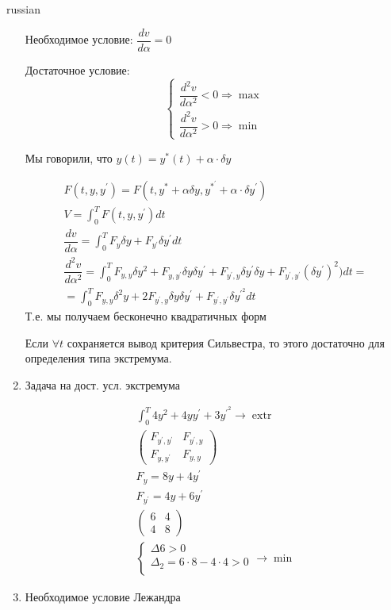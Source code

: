 \documentclass{article}
\begin{document}
\begin{otherlanguage*}{russian}
\begin{enumerate}
Необходимое условие: $ \dfrac{dv}{d \alpha} = 0 $ 

Достаточное условие: 
\begin{equation*}
\begin{cases}\dfrac{d^2 v}{d \alpha ^ 2 } < 0 \Rightarrow \max \\
\dfrac{d^2 v}{d \alpha^2} > 0 \Rightarrow \min 
\end{cases}
\end{equation*}

Мы говорили, что $ y(t) = y^{*} (t) + \alpha \cdot \delta y $

\begin{align*}
F(t, y, y^{'}) = F(t, y^{*} + \alpha \delta y, y^{*^{'}} + \alpha \cdot \delta y ^{'} ) \\
V = \int_0^T F(t, y, y^{'} ) dt \\
\dfrac{dv}{d \alpha} = \int_0^T F_y \delta y + F_{y^{'}} \delta y ^{'} dt  \\
\dfrac{d^2 v}{d \alpha ^ 2} = \int_0^T F_{y,y} \delta y ^ 2 + F_{y,y^{'}} \delta y \delta y ^{'} + F_{y^{'}, y} \delta y ^{'} \delta y + F_{y^{'}, y^{'}} (\delta y ^{'})^2 ) dt = \\
= \int_0^T F_{y, y} \delta ^ 2 y + 2 F_{y^{'}, y} \delta y \delta y^{'} + F_{y^{'}, y^{'}} \delta y^{'^{2}} dt 
\end{align*}
Т.е. мы получаем бесконечно квадратичных форм 

Если $ \forall t $ сохраняется вывод критерия Сильвестра, то этого достаточно для определения типа экстремума. 

\item Задача на дост. усл. экстремума

\begin{align*}
\int_0^T 4 y ^ 2 + 4 y y^{'} + 3 y^{'^{2}} \rightarrow \operatorname{extr} \\
\begin{pmatrix}
F_{y^{'}, y^{'}} & F_{y^{'}, y} \\
F_{y, y^{'}} & F_{y, y}
\end{pmatrix} \\
F_y = 8 y + 4 y^{'} \\
F_{y^{'}} = 4 y + 6 y ^{'} \\
\begin{pmatrix}
6 & 4 \\
4 & 8 
\end{pmatrix} \\
\begin{cases}
\Delta 6 > 0 \\
\Delta_2 = 6 \cdot 8 - 4 \cdot 4 > 0 \\
\end{cases} \rightarrow \min 
\end{align*}
\item Необходимое условие Лежандра 


\end{enumerate}
\end{otherlanguage*}
\end{document}
